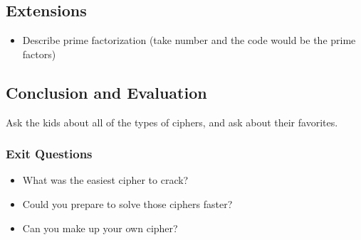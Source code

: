 \documentclass{lessonplan}
\begin{document}
    \subsection{Extensions}
      \begin{itemize}
        \item Describe prime factorization (take number and the code would be the prime factors)
      \end{itemize}
    \subsection{Conclusion and Evaluation}
      Ask the kids about all of the types of ciphers, and ask about their favorites.
      \subsubsection{Exit Questions}
      \begin{itemize}
        \item What was the easiest cipher to crack?
        \item Could you prepare to solve those ciphers faster?
        \item Can you make up your own cipher?
      \end{itemize}
\end{document}

